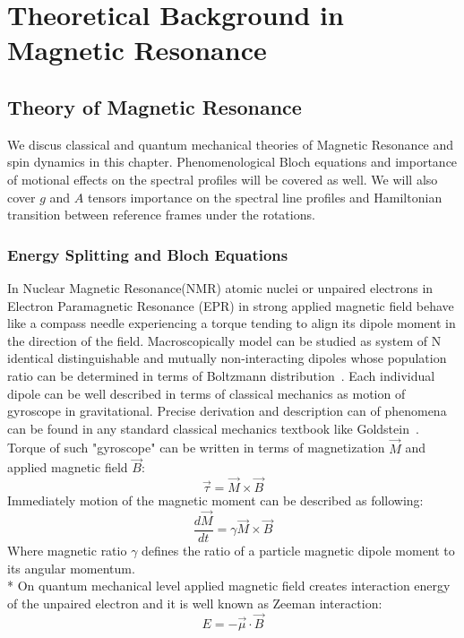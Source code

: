 \chapter{Theoretical Background in Magnetic Resonance}
\section{Theory of Magnetic Resonance}
We discus classical and quantum mechanical theories of Magnetic Resonance and spin dynamics in this chapter. Phenomenological Bloch equations and importance of motional effects on the spectral profiles will be covered as well. We will also cover $g$ and $A$ tensors importance on the spectral line profiles and Hamiltonian transition between reference frames under the rotations. 
\subsection{Energy Splitting and Bloch Equations}
In Nuclear Magnetic Resonance(NMR) atomic nuclei or unpaired electrons in Electron Paramagnetic Resonance (EPR) in strong applied magnetic field behave like a compass needle experiencing a torque tending to align its dipole moment in the direction of the field. Macroscopically model can be studied as system of N identical distinguishable and mutually non-interacting dipoles whose population ratio can be determined in terms of Boltzmann distribution~\cite{pathria}. Each individual dipole can be well described in terms of classical mechanics as motion of gyroscope in gravitational. Precise derivation and description can of phenomena can be found in any standard classical mechanics textbook like Goldstein~\cite{gold}. Torque of such "gyroscope" can be written in terms of magnetization $\vec{M}$ and applied magnetic field $\vec{B}$:
\begin{equation}\label{eq:torque}
\vec{\tau}=\vec{M}\times\vec{B}
\end{equation}
Immediately motion of the magnetic moment can be described as following: 
\begin{equation}\label{eq:torque2}
\frac{d\vec{M}}{dt}=\gamma\vec{M}\times\vec{B}
\end{equation}
Where magnetic ratio $\gamma$ defines the ratio of a particle magnetic dipole moment to its angular momentum.\\*
On quantum mechanical level applied magnetic field creates interaction energy of the unpaired electron and it is well known as Zeeman interaction: 
\begin{equation}\label{eq:1}
E = - \vec{\mu}\cdot \vec{B}
\end{equation}  
